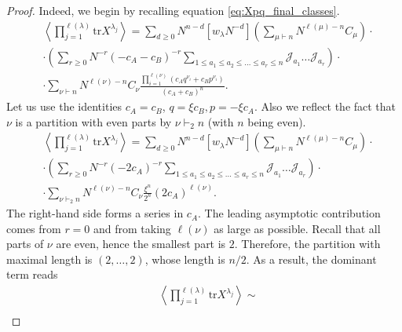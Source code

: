 \documentclass{article}
\newcommand{\tr}{\mathrm{tr}}
\theoremstyle{plain}
\theoremstyle{definition}
\numberwithin{equation}{section}
\begin{document}
\begin{proof}
Indeed, we begin by recalling equation \eqref{eq:Xpq_final_classes}. 
\begin{equation}
    \label{eq:Xpq_final_classes_repeat}
    \begin{aligned}
        & \left\langle \prod_{j=1}^{\ell(\lambda)} \tr X^{\lambda_{j}} \right\rangle = \sum\limits_{d\ge 0}  N^{n- d} [w_\lambda N^{-d}] \left(\sum_{\mu \vdash n}N^{\ell(\mu)-n} C_\mu \right)\cdot \\
        & \cdot  \left(\sum_{r\ge 0}N^{-r}(-c_A - c_B)^{-r} \sum_{1 \le a_1 \le a_2 \le \dots \le a_r \le n}\mathcal{J}_{a_1}\dots \mathcal{J}_{a_r}\right) \cdot \\
        & \cdot \sum_{\nu \vdash n}   N^{\ell(\nu)-n} C_\nu \frac{\prod_{i=1}^{\ell(\nu)} (c_A q^{\nu_i} + c_B p^{\nu_i})}{(c_A+c_B)^{n}}.
    \end{aligned}
\end{equation}
Let us use the identities $c_A = c_B$, $q = \xi c_B, p = - \xi c_A$. Also we reflect the fact that $\nu$ is a partition with even parts by $\nu \vdash_2 n$ (with $n$ being even).
\begin{equation}
    \label{eq:Xpq_final_classes_repeat_qp}
    \begin{aligned}
        & \left\langle \prod_{j=1}^{\ell(\lambda)} \tr X^{\lambda_{j}} \right\rangle = \sum\limits_{d\ge 0}  N^{n- d} [w_\lambda N^{-d}] \left(\sum_{\mu \vdash n}N^{\ell(\mu)-n} C_\mu \right)\cdot \\
        & \cdot  \left(\sum_{r\ge 0}N^{-r}(-2c_A)^{-r} \sum_{1 \le a_1 \le a_2 \le \dots \le a_r \le n}\mathcal{J}_{a_1}\dots \mathcal{J}_{a_r}\right) \cdot \\
        & \cdot \sum_{\nu \vdash_2 n}   N^{\ell(\nu)-n} C_\nu \frac{\xi^n}{2^n} (2c_A)^{\ell(\nu)}.
    \end{aligned}
\end{equation}
The right-hand side forms a series in $c_A$. The leading asymptotic contribution comes from $r=0$ and from taking $\ell(\nu)$ as large as possible. Recall that all parts of $\nu$ are even, hence the smallest part is $2$. Therefore, the partition with maximal length is $(2,\ldots,2)$, whose length is $n/2$. As a result, the dominant term reads
\begin{equation}
    \label{eq:Xpq_final_classes_repeat_main_entry}
    \begin{aligned}
        & \left\langle \prod_{j=1}^{\ell(\lambda)} \tr X^{\lambda_{j}} \right\rangle \sim \\

\end{aligned}
\end{equation}
\end{proof}
\end{document}
